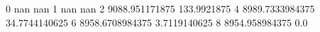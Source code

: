 0 nan nan
1 nan nan
2 9088.951171875 133.9921875
4 8989.7333984375 34.7744140625
6 8958.6708984375 3.7119140625
8 8954.958984375 0.0
